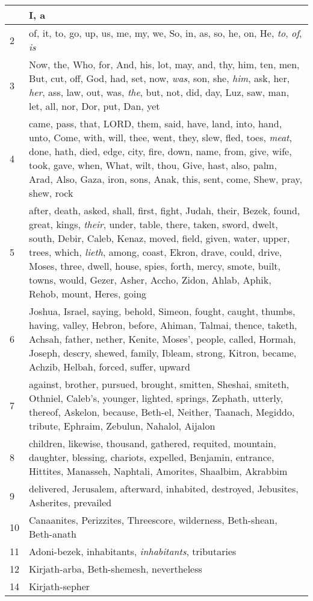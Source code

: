 \begin{longtable}{l|p{3.75in}}
\hline \hline
\endlastfoot
1 & I, a \\ \hline
2 & of, it, to, go, up, us, me, my, we, So, in, as, so, he, on, He, \emph{to}, \emph{of}, \emph{is} \\ \hline
3 & Now, the, Who, for, And, his, lot, may, and, thy, him, ten, men, But, cut, off, God, had, set, now, \emph{was}, son, she, \emph{him}, ask, her, \emph{her}, ass, law, out, was, \emph{the}, but, not, did, day, Luz, saw, man, let, all, nor, Dor, put, Dan, yet \\ \hline
4 & came, pass, that, LORD, them, said, have, land, into, hand, unto, Come, with, will, thee, went, they, slew, fled, toes, \emph{meat}, done, hath, died, edge, city, fire, down, name, from, give, wife, took, gave, when, What, wilt, thou, Give, hast, also, palm, Arad, Also, Gaza, iron, sons, Anak, this, sent, come, Shew, pray, shew, rock \\ \hline
5 & after, death, asked, shall, first, fight, Judah, their, Bezek, found, great, kings, \emph{their}, under, table, there, taken, sword, dwelt, south, Debir, Caleb, Kenaz, moved, field, given, water, upper, trees, which, \emph{lieth}, among, coast, Ekron, drave, could, drive, Moses, three, dwell, house, spies, forth, mercy, smote, built, towns, would, Gezer, Asher, Accho, Zidon, Ahlab, Aphik, Rehob, mount, Heres, going \\ \hline
6 & Joshua, Israel, saying, behold, Simeon, fought, caught, thumbs, having, valley, Hebron, before, Ahiman, Talmai, thence, taketh, Achsah, father, nether, Kenite, Moses', people, called, Hormah, Joseph, descry, shewed, family, Ibleam, strong, Kitron, became, Achzib, Helbah, forced, suffer, upward \\ \hline
7 & against, brother, pursued, brought, smitten, Sheshai, smiteth, Othniel, Caleb's, younger, lighted, springs, Zephath, utterly, thereof, Askelon, because, Beth-el, Neither, Taanach, Megiddo, tribute, Ephraim, Zebulun, Nahalol, Aijalon \\ \hline
8 & children, likewise, thousand, gathered, requited, mountain, daughter, blessing, chariots, expelled, Benjamin, entrance, Hittites, Manasseh, Naphtali, Amorites, Shaalbim, Akrabbim \\ \hline
9 & delivered, Jerusalem, afterward, inhabited, destroyed, Jebusites, Asherites, prevailed \\ \hline
10 & Canaanites, Perizzites, Threescore, wilderness, Beth-shean, Beth-anath \\ \hline
11 & Adoni-bezek, inhabitants, \emph{inhabitants}, tributaries \\ \hline
12 & Kirjath-arba, Beth-shemesh, nevertheless \\ \hline
14 & Kirjath-sepher \\ \hline
\end{longtable}






